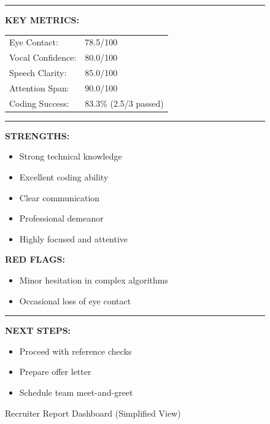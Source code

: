\documentclass[12pt,a4paper]{article}
\begin{document}
\begin{figure}[h!]
{\begin{minipage}{0.95\textwidth}
\vspace{0.5cm}

\rule{\textwidth}{0.4pt}

\vspace{0.3cm}

\textbf{KEY METRICS:}

\begin{tabular}{ll}
Eye Contact: & 78.5/100 \\
Vocal Confidence: & 80.0/100 \\
Speech Clarity: & 85.0/100 \\
Attention Span: & 90.0/100 \\
Coding Success: & 83.3\% (2.5/3 passed) \\
\end{tabular}

\vspace{0.5cm}

\rule{\textwidth}{0.4pt}

\vspace{0.3cm}

\textbf{STRENGTHS:}
\begin{itemize}
    \item[\checkmark] Strong technical knowledge
    \item[\checkmark] Excellent coding ability
    \item[\checkmark] Clear communication
    \item[\checkmark] Professional demeanor
    \item[\checkmark] Highly focused and attentive
\end{itemize}

\textbf{RED FLAGS:}
\begin{itemize}
    \item[\textcolor{warningyellow}{⚠}] Minor hesitation in complex algorithms
    \item[\textcolor{warningyellow}{⚠}] Occasional loss of eye contact
\end{itemize}

\vspace{0.3cm}

\rule{\textwidth}{0.4pt}

\vspace{0.3cm}

\textbf{NEXT STEPS:}
\begin{itemize}
    \item Proceed with reference checks
    \item Prepare offer letter
    \item Schedule team meet-and-greet
\end{itemize}

\end{minipage}}
\caption{Recruiter Report Dashboard (Simplified View)}
\end{figure}
\end{document}
